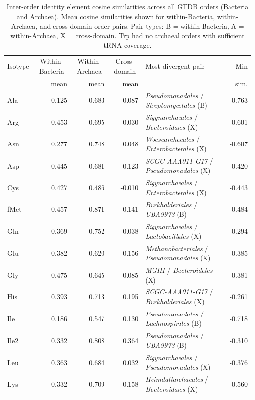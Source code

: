 \begin{table}[!ht]
\centering
\small
\caption{Inter-order identity element cosine similarities across all GTDB orders (Bacteria and Archaea). Mean cosine similarities shown for within-Bacteria, within-Archaea, and cross-domain order pairs. Pair types: B = within-Bacteria, A = within-Archaea, X = cross-domain. Trp had no archaeal orders with sufficient tRNA coverage.}
\label{tab:order_identity_all}
\begin{tabular}{lrrrlr}
\toprule
Isotype & \multicolumn{1}{c}{Within-Bacteria} & \multicolumn{1}{c}{Within-Archaea} & \multicolumn{1}{c}{Cross-domain} & Most divergent pair & Min \\
 & mean & mean & mean & & sim. \\
\midrule
  Ala & 0.125 & 0.683 & 0.087 & \textit{Pseudomonadales} / \textit{Streptomycetales} (B) & -0.763 \\
  Arg & 0.453 & 0.695 & -0.030 & \textit{Sigynarchaeales} / \textit{Bacteroidales} (X) & -0.601 \\
  Asn & 0.277 & 0.748 & 0.048 & \textit{Woesearchaeales} / \textit{Enterobacterales} (X) & -0.607 \\
  Asp & 0.445 & 0.681 & 0.123 & \textit{SCGC-AAA011-G17} / \textit{Pseudomonadales} (X) & -0.420 \\
  Cys & 0.427 & 0.486 & -0.010 & \textit{Sigynarchaeales} / \textit{Enterobacterales} (X) & -0.443 \\
  fMet & 0.457 & 0.871 & 0.141 & \textit{Burkholderiales} / \textit{UBA9973} (B) & -0.484 \\
  Gln & 0.369 & 0.752 & 0.038 & \textit{Sigynarchaeales} / \textit{Lactobacillales} (X) & -0.294 \\
  Glu & 0.382 & 0.620 & 0.156 & \textit{Methanobacteriales} / \textit{Pseudomonadales} (X) & -0.385 \\
  Gly & 0.475 & 0.645 & 0.085 & \textit{MGIII} / \textit{Bacteroidales} (X) & -0.381 \\
  His & 0.393 & 0.713 & 0.195 & \textit{SCGC-AAA011-G17} / \textit{Burkholderiales} (X) & -0.261 \\
  Ile & 0.186 & 0.547 & 0.130 & \textit{Pseudomonadales} / \textit{Lachnospirales} (B) & -0.718 \\
  Ile2 & 0.332 & 0.808 & 0.364 & \textit{Pseudomonadales} / \textit{UBA9973} (B) & -0.310 \\
  Leu & 0.363 & 0.684 & 0.032 & \textit{Sigynarchaeales} / \textit{Pseudomonadales} (X) & -0.376 \\
  Lys & 0.332 & 0.709 & 0.158 & \textit{Heimdallarchaeales} / \textit{Bacteroidales} (X) & -0.560 \\

\end{tabular}
\end{table}
